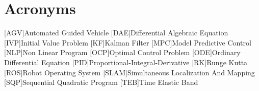 \chapter*{Acronyms}

\begin{acronym}[PECVD]
    [AGV]{Automated Guided Vehicle}
    [DAE]{Differential Algebraic Equation}
    [IVP]{Initial Value Problem}
    [KF]{Kalman Filter}
    [MPC]{Model Predictive Control}
    [NLP]{Non Linear Program}
    [OCP]{Optimal Control Problem}
    [ODE]{Ordinary Differential Equation}
    [PID]{Proportional-Integral-Derivative}
    [RK]{Runge Kutta}
    [ROS]{Robot Operating System}
    [SLAM]{Simultaneous Localization And Mapping}
    [SQP]{Sequential Quadratic Program}
    [TEB]{Time Elastic Band}
\end{acronym}